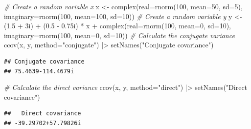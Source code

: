 \documentclass[
]{book}
\newenvironment{Shaded}{\begin{snugshade}}{\end{snugshade}}
\newcommand{\AttributeTok}[1]{\textcolor[rgb]{0.77,0.63,0.00}{#1}}
\newcommand{\CommentTok}[1]{\textcolor[rgb]{0.56,0.35,0.01}{\textit{#1}}}
\newcommand{\DecValTok}[1]{\textcolor[rgb]{0.00,0.00,0.81}{#1}}
\newcommand{\FloatTok}[1]{\textcolor[rgb]{0.00,0.00,0.81}{#1}}
\newcommand{\FunctionTok}[1]{\textcolor[rgb]{0.00,0.00,0.00}{#1}}
\newcommand{\NormalTok}[1]{#1}
\newcommand{\OtherTok}[1]{\textcolor[rgb]{0.56,0.35,0.01}{#1}}
\newcommand{\SpecialCharTok}[1]{\textcolor[rgb]{0.00,0.00,0.00}{#1}}
\newcommand{\StringTok}[1]{\textcolor[rgb]{0.31,0.60,0.02}{#1}}
\begin{document}
\begin{Shaded}
\begin{Highlighting}[]
\CommentTok{\# Create a random variable x}
\NormalTok{x }\OtherTok{\textless{}{-}} \FunctionTok{complex}\NormalTok{(}\AttributeTok{real=}\FunctionTok{rnorm}\NormalTok{(}\DecValTok{100}\NormalTok{, }\AttributeTok{mean=}\DecValTok{50}\NormalTok{, }\AttributeTok{sd=}\DecValTok{5}\NormalTok{),}
             \AttributeTok{imaginary=}\FunctionTok{rnorm}\NormalTok{(}\DecValTok{100}\NormalTok{, }\AttributeTok{mean=}\DecValTok{100}\NormalTok{, }\AttributeTok{sd=}\DecValTok{10}\NormalTok{))}
\CommentTok{\# Create a random variable y}
\NormalTok{y }\OtherTok{\textless{}{-}}\NormalTok{ (}\FloatTok{1.5} \SpecialCharTok{+}\NormalTok{ 3i) }\SpecialCharTok{+}\NormalTok{ (}\FloatTok{0.5} \SpecialCharTok{{-}} \FloatTok{0.75}\NormalTok{i) }\SpecialCharTok{*}\NormalTok{ x }\SpecialCharTok{+}
            \FunctionTok{complex}\NormalTok{(}\AttributeTok{real=}\FunctionTok{rnorm}\NormalTok{(}\DecValTok{100}\NormalTok{, }\AttributeTok{mean=}\DecValTok{0}\NormalTok{, }\AttributeTok{sd=}\DecValTok{10}\NormalTok{),}
                    \AttributeTok{imaginary=}\FunctionTok{rnorm}\NormalTok{(}\DecValTok{100}\NormalTok{, }\AttributeTok{mean=}\DecValTok{0}\NormalTok{, }\AttributeTok{sd=}\DecValTok{10}\NormalTok{))}
\CommentTok{\# Calculate the conjugate variance}
\FunctionTok{ccov}\NormalTok{(x, y, }\AttributeTok{method=}\StringTok{"conjugate"}\NormalTok{) }\SpecialCharTok{|\textgreater{}}
    \FunctionTok{setNames}\NormalTok{(}\StringTok{"Conjugate covariance"}\NormalTok{)}
\end{Highlighting}
\end{Shaded}

\begin{verbatim}
## Conjugate covariance 
## 75.4639-114.4679i
\end{verbatim}

\begin{Shaded}
\begin{Highlighting}[]
\CommentTok{\# Calculate the direct variance}
\FunctionTok{ccov}\NormalTok{(x, y, }\AttributeTok{method=}\StringTok{"direct"}\NormalTok{) }\SpecialCharTok{|\textgreater{}}
    \FunctionTok{setNames}\NormalTok{(}\StringTok{"Direct covariance"}\NormalTok{)}
\end{Highlighting}
\end{Shaded}

\begin{verbatim}
##   Direct covariance 
## -39.29702+57.79826i
\end{verbatim}
\end{document}

